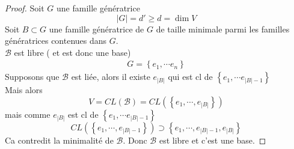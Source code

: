 \documentclass[../main.tex]{subfiles}
\begin{document}
\begin{proof}
Soit $G$ une famille génératrice
\[ 
|G| = d' \geq d = \dim V
\]
Soit $B\subset G$ une famille génératrice de $G$ de taille minimale parmi les familles génératrices contenues dans $G$.\\
$\mathcal{B}$ est libre ( et est donc une base) 
\begin{align*}
G = \left\{ e_1, \cdots e_n \right\} 
\end{align*}
Supposons que $\mathcal{B}$ est liée, alors il existe $e_{|B|} $ qui est cl de $ \left\{ e_1, \cdots e_{|B|-1}  \right\} $ \\
Mais alors 
\[ 
	V= CL( \mathcal{B}) = CL( \left\{ e_1,\cdots, e_{|B|}  \right\} ) 
\]
mais comme $e_{|B|}$ est cl de $ \left\{ e_1, \cdots e_{|B|-1}   \right\} $
\[ 
	CL( \left\{ e_1,\cdots, e_{|B|-1}  \right\} ) \supset \left\{ e_1,\cdots, e_{|B|-1} , e_{|B|}   \right\} 
\]
Ca contredit la minimalité de $\mathcal{B}$. Donc $\mathcal{B}$ est libre et c'est une base.

\end{proof}
\end{document}
